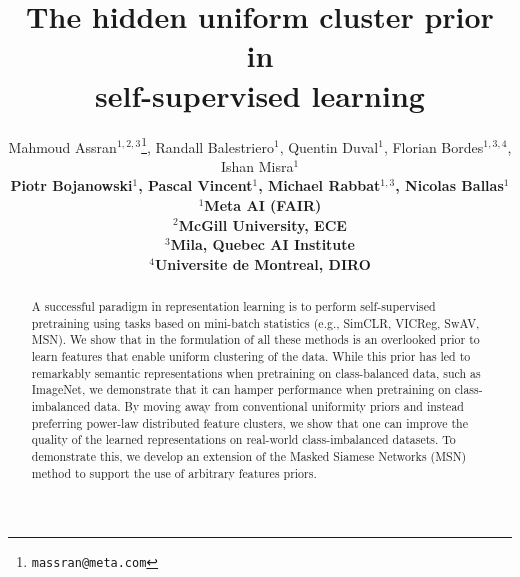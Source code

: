 \documentclass{article} %
\title{The hidden uniform cluster prior in\\self-supervised learning}
\author{Mahmoud Assran$^{1,2,3}$\thanks{\texttt{massran@meta.com}}, Randall Balestriero$^{1}$, Quentin Duval$^{1}$, Florian Bordes$^{1,3,4}$, Ishan Misra$^{1}$\\
\bf Piotr Bojanowski$^{1}$, Pascal Vincent$^{1}$, Michael Rabbat$^{1,3}$, Nicolas Ballas$^{1}$\\
$^{1}$Meta AI (FAIR) \\
$^{2}$McGill University, ECE \\
$^{3}$Mila, Quebec AI Institute\\
$^{4}$Universite de Montreal, DIRO
}
\begin{document}
\maketitle


\begin{abstract}
A successful paradigm in representation learning is to perform self-supervised pretraining using tasks based on mini-batch statistics (e.g., SimCLR, VICReg, SwAV, MSN).
We show that in the formulation of all these methods is an overlooked prior to learn features that enable uniform clustering of the data.
While this prior has led to remarkably semantic representations when pretraining on class-balanced data, such as ImageNet, we demonstrate that it can hamper performance when pretraining on class-imbalanced data.
By moving away from conventional uniformity priors and instead preferring power-law distributed feature clusters, we show that one can improve the quality of the learned representations on real-world class-imbalanced datasets.
To demonstrate this, we develop an extension of the Masked Siamese Networks (MSN) method to support the use of arbitrary features priors.






\end{abstract}
\end{document}
